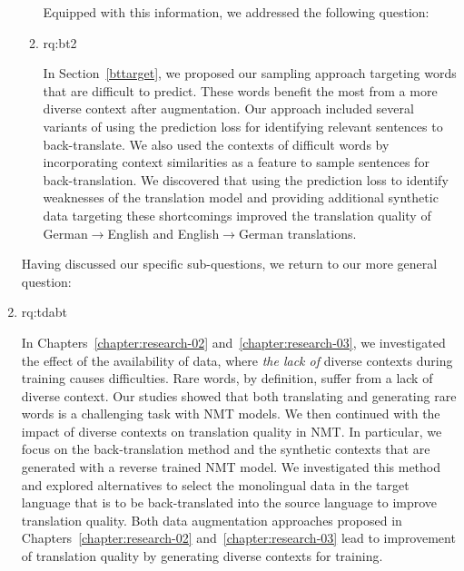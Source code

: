 \begin{enumerate}[label=\textbf{Research Question \arabic*:},ref={RQ\arabic*},wide = 0pt]
\begin{enumerate}[label=\textbf{RQ2.\arabic* },wide = 0pt, leftmargin=2em]
Equipped with this information, we addressed the following question:

\item \acl{rq:bt2} \label{rq:bt2}

\medskip

\noindent In Section~\ref{bttarget}, we proposed our sampling approach targeting words that are difficult to predict.
These words benefit the most from a more diverse context after augmentation.
Our approach included several variants of using the prediction loss for identifying relevant sentences to back-translate.
We also used the contexts of difficult words by incorporating context similarities as a feature to sample sentences for back-translation.
We discovered that using the prediction loss to identify weaknesses of the translation model and providing additional synthetic data targeting these shortcomings improved the translation quality of German$\rightarrow$English and English$\rightarrow$German translations. %

\end{enumerate}

Having discussed our specific sub-questions, we return to our more general question:

\item \acl{rq:tdabt}  \label{rq:tdabt}

\medskip

 \noindent In Chapters~\ref{chapter:research-02} and~\ref{chapter:research-03}, we investigated the effect of the availability of data, where \textit{the lack of} diverse contexts during training causes difficulties.
Rare words, by definition, suffer from a lack of diverse context. 
Our studies showed that both translating and generating rare words is a challenging task with NMT models. 
We then continued with the impact of diverse contexts on translation quality in NMT. 
In particular, we focus on the back-translation method and the synthetic contexts that are generated with a reverse trained NMT model. 
We investigated this method and explored alternatives to select the monolingual data in the target language that is to be back-translated into the source language to improve translation quality.
Both data augmentation approaches proposed in Chapters~\ref{chapter:research-02} and~\ref{chapter:research-03} lead to improvement of translation quality by generating diverse contexts for training.


\end{enumerate}
